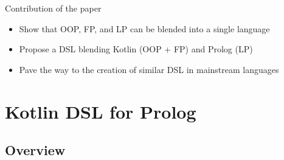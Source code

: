 \documentclass[presentation]{beamer}
\begin{document}
\begin{frame}{Contribution of the paper}

\begin{itemize}
    \item Show that OOP, FP, and LP can be blended into a single language

    \vfill

    \item Propose a DSL blending Kotlin (OOP + FP) and Prolog (LP)

    \vfill

    \item Pave the way to the creation of similar DSL in mainstream languages
\end{itemize}

\end{frame}

\section{Kotlin DSL for Prolog}

\subsection{Overview}
\end{document}
